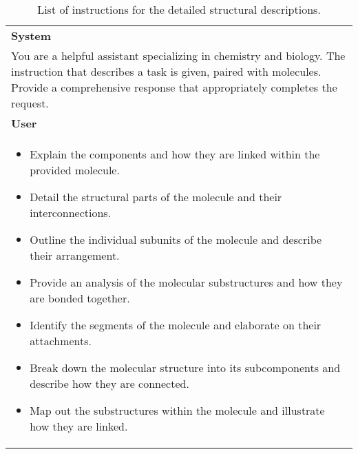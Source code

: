 
\begin{table*}[h!]
\centering  
\footnotesize
\begin{tcolorbox}[enhanced,breakable,
    colframe=gray!50!white,
    colbacktitle=white,
    coltitle=black,
    colback=white,
    borderline={0.5mm}{0mm}{gray!15!white},
    borderline={0.5mm}{0mm}{gray!50!white,dashed},
    attach boxed title to top center={yshift=-2mm},
    boxed title style={boxrule=0.8pt}]
    \renewcommand{\arraystretch}{1.1}
    \begin{tabular}{p{.95\linewidth}}
        \textbf{System}\\
        You are a helpful assistant specializing in chemistry and biology. The instruction that describes a task is given, paired with molecules. Provide a comprehensive response that appropriately completes the request. \\
        \midrule
        \textbf{User}\\
        \vspace{-0.1in}
        \begin{itemize}[topsep=-5mm, itemsep=1pt, parsep=0pt, leftmargin=*]    
            \item Explain the components and how they are linked within the provided molecule.
            \item Detail the structural parts of the molecule and their interconnections.
            \item Outline the individual subunits of the molecule and describe their arrangement.
            \item Provide an analysis of the molecular substructures and how they are bonded together.
            \item Identify the segments of the molecule and elaborate on their attachments.
            \item Break down the molecular structure into its subcomponents and describe how they are connected.
            \item Map out the substructures within the molecule and illustrate how they are linked.
        \end{itemize}
        \vspace{-0.3in}
    \end{tabular}
\end{tcolorbox}
\vspace{-0.15in}
\caption{List of instructions for the detailed structural descriptions.}
\label{app:tab:instructions_structural}
\end{table*}
